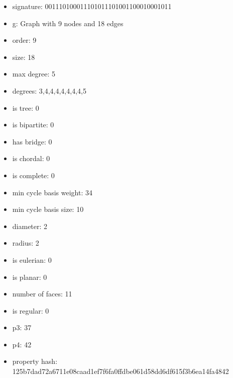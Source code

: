 \newpage
\begin{figure}
\end{figure}
\begin{itemize}
\item signature: 001110100011101011101001100010001011
\item g: Graph with 9 nodes and 18 edges
\item order: 9
\item size: 18
\item max degree: 5
\item degrees: 3,4,4,4,4,4,4,4,5
\item is tree: 0
\item is bipartite: 0
\item has bridge: 0
\item is chordal: 0
\item is complete: 0
\item min cycle basis weight: 34
\item min cycle basis size: 10
\item diameter: 2
\item radius: 2
\item is eulerian: 0
\item is planar: 0
\item number of faces: 11
\item is regular: 0
\item p3: 37
\item p4: 42
\item property hash: 125b7dad72a6711e08caad1ef7f6fa0ffdbe061d58dd6df615f3b6ea14fa4842
\end{itemize}
